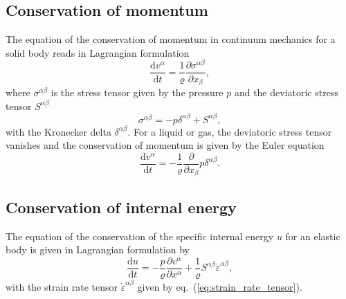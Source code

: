 \documentclass[10pt,fleqn,twoside]{article}
\begin{document}
\subsection{Conservation of momentum}
The equation of the conservation of momentum in continuum mechanics for a solid body reads in Lagrangian formulation
\begin{equation}
\label{eq:conservation_of_momentum}
\frac{\mathrm{d} {v^\alpha}}{\mathrm{d}t} =  \frac{1}{\varrho}  \frac{\partial \sigma^{\alpha
\beta} }{\partial x_\beta},
\end{equation}
where $\sigma^{\alpha\beta}$ is the stress tensor given by the pressure $p$ and the deviatoric stress tensor
${S}^{\alpha \beta}$
\begin{equation}
\sigma^{\alpha \beta} = -p \delta^{\alpha \beta} + S^{\alpha \beta},
\end{equation}
with the Kronecker delta $\delta^{\alpha \beta}$.
For a liquid or gas, the deviatoric stress tensor vanishes and the conservation of momentum is given by the Euler
equation
\begin{equation}
\frac{\mathrm{d} {v^\alpha}}{\mathrm{d}t} =  - \frac{1}{\varrho}  \frac{\partial}{\partial x_\beta} p \delta^{\alpha \beta}.
\end{equation}
\subsection{Conservation of internal energy}
The equation of the conservation of the specific internal energy $u$ for an elastic body is given in Lagrangian formulation by
\begin{equation}
\label{eq:conservation_internal_energy}
\frac{\mathrm{d} u }{\mathrm{d} t} = - \frac{p}{\varrho} \frac{\partial v ^\alpha}{\partial x^\alpha} + \frac{1}{\varrho}
S^{\alpha \beta} \dot{\varepsilon}^{\alpha \beta},
\end{equation}
with the strain rate tensor $\dot{\varepsilon}^{\alpha \beta}$ given by eq.~(\ref{eq:strain_rate_tensor}).
\end{document}

